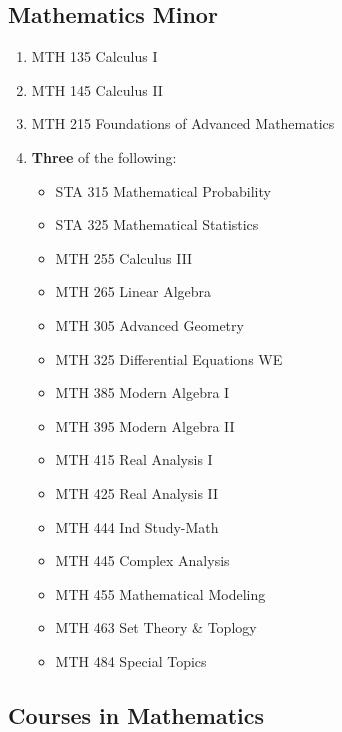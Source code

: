 \documentclass[
  letterpaper,
]{scrbook}
\providecommand{\tightlist}{%
  \setlength{\itemsep}{0pt}\setlength{\parskip}{0pt}}
\begin{document}
\subsection{Mathematics Minor}\label{mathematics-minor}

\begin{enumerate}
\def\labelenumi{\arabic{enumi}.}
\tightlist
\item
  MTH 135 Calculus I
\item
  MTH 145 Calculus II
\item
  MTH 215 Foundations of Advanced Mathematics
\item
  \textbf{Three} of the following:

  \begin{itemize}
  \tightlist
  \item
    STA 315 Mathematical Probability
  \item
    STA 325 Mathematical Statistics
  \item
    MTH 255 Calculus III
  \item
    MTH 265 Linear Algebra
  \item
    MTH 305 Advanced Geometry
  \item
    MTH 325 Differential Equations WE
  \item
    MTH 385 Modern Algebra I
  \item
    MTH 395 Modern Algebra II
  \item
    MTH 415 Real Analysis I
  \item
    MTH 425 Real Analysis II
  \item
    MTH 444 Ind Study-Math
  \item
    MTH 445 Complex Analysis
  \item
    MTH 455 Mathematical Modeling
  \item
    MTH 463 Set Theory \& Toplogy
  \item
    MTH 484 Special Topics
  \end{itemize}
\end{enumerate}

\subsection{Courses in Mathematics}\label{courses-in-mathematics}
\end{document}
